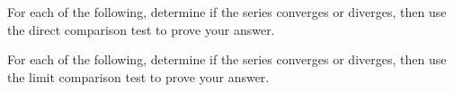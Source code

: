 \begin{questions}
\question For each of the following, determine if the series converges or diverges, then use the direct comparison test to prove your answer.


\newpage

\question For each of the following, determine if the series converges or diverges, then use the limit comparison test to prove your answer.




\end{questions}